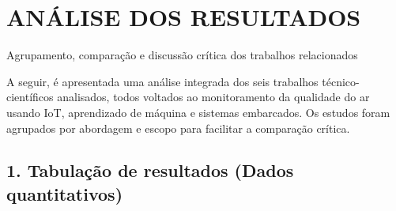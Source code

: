 \documentclass[12pt,a4paper]{article}
\begin{document}
  \newpage

\newpage
\section*{ANÁLISE DOS RESULTADOS}

\noindent Agrupamento, comparação e discussão crítica dos trabalhos relacionados

A seguir, é apresentada uma análise integrada dos seis trabalhos técnico-científicos analisados, todos voltados ao monitoramento da qualidade do ar usando IoT, aprendizado de máquina e sistemas embarcados. Os estudos foram agrupados por abordagem e escopo para facilitar a comparação crítica.

\subsection*{1. Tabulação de resultados (Dados quantitativos)}
\end{document}
